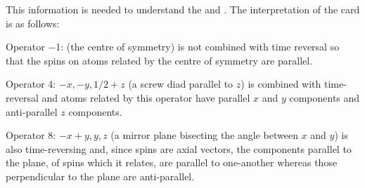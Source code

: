 \begin{varindent}{1 cm}
This information is needed to understand the  and 
.
The interpretation of the card  is as follows:
\end{varindent}
\begin{list} {} {\setlength{\labelwidth}{25mm}
  \setlength{\parsep}{-1ex}
  \setlength{\leftmargin}{\labelwidth}
 \addtolength{\leftmargin}{1cm}}
\item[Operator $-$1: \hfill] (the centre of symmetry) is not combined with 
time reversal so that
the spins on atoms related by the centre of symmetry are parallel.
\item[Operator 4: \hfill] $-x,-y,1/2+z$ (a screw diad parallel to $z$) is combined
with time-reversal and atoms related by this operator have parallel $x$
and $y$
components and anti-parallel $z$ components.
\item[Operator 8: \hfill] $-x+y,y,z$ (a mirror plane 
bisecting the angle between $x$ and $y$) is also
time-reversing and, since spins are axial vectors, the components parallel
to the plane, of spins which it relates, are parallel to one-another
whereas those perpendicular
to the plane are anti-parallel.\end{list}
\p
